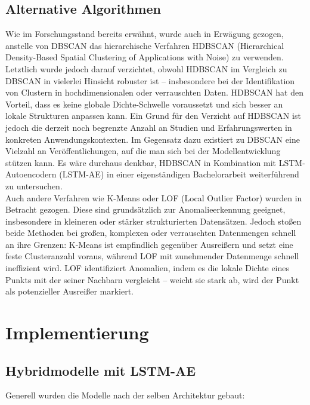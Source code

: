 \documentclass[a4paper,12pt]{article}
\begin{document}
	\subsection{Alternative Algorithmen}
	Wie im Forschungsstand bereits erwähnt, wurde auch in Erwägung gezogen, anstelle von DBSCAN das hierarchische Verfahren HDBSCAN (Hierarchical Density-Based Spatial Clustering of Applications with Noise) zu verwenden. Letztlich wurde jedoch darauf verzichtet, obwohl HDBSCAN im Vergleich zu DBSCAN in vielerlei Hinsicht robuster ist – insbesondere bei der Identifikation von Clustern in hochdimensionalen oder verrauschten Daten. HDBSCAN hat den Vorteil, dass es keine globale Dichte-Schwelle voraussetzt und sich besser an lokale Strukturen anpassen kann. Ein Grund für den Verzicht auf HDBSCAN ist jedoch die derzeit noch begrenzte Anzahl an Studien und Erfahrungswerten in konkreten Anwendungskontexten. Im Gegensatz dazu existiert zu DBSCAN eine Vielzahl an Veröffentlichungen, auf die man sich bei der Modellentwicklung stützen kann. Es wäre durchaus denkbar, HDBSCAN in Kombination mit LSTM-Autoencodern (LSTM-AE) in einer eigenständigen Bachelorarbeit weiterführend zu untersuchen.
	\\[0.5em]
	Auch andere Verfahren wie K-Means oder LOF (Local Outlier Factor) wurden in Betracht gezogen. Diese sind grundsätzlich zur Anomalieerkennung geeignet, insbesondere in kleineren oder stärker strukturierten Datensätzen. Jedoch stoßen beide Methoden bei großen, komplexen oder verrauschten Datenmengen schnell an ihre Grenzen: K-Means ist empfindlich gegenüber Ausreißern und setzt eine feste Clusteranzahl voraus, während LOF mit zunehmender Datenmenge schnell ineffizient wird. LOF identifiziert Anomalien, indem es die lokale Dichte eines Punkts mit der seiner Nachbarn vergleicht – weicht sie stark ab, wird der Punkt als potenzieller Ausreißer markiert.
	
	\section{Implementierung}
	\subsection{Hybridmodelle mit LSTM-AE}
	Generell wurden die Modelle nach der selben Architektur gebaut:
	
\end{document}
